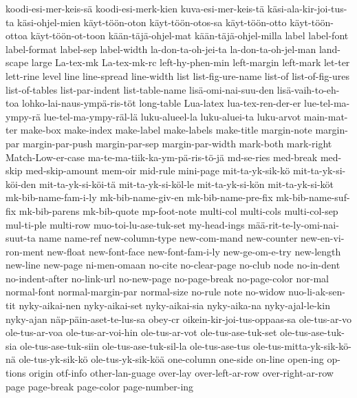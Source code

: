 {  koodi-esi-mer-keis-sä
  koodi-esi-merk-kien
  kuva-esi-mer-keis-tä
  käsi-ala-kir-joi-tus-ta
  käsi-ohjel-mien
  käyt-töön-oton
  käyt-töön-otos-sa
  käyt-töön-otto
  käyt-töön-ottoa
  käyt-töön-ot-toon
  kään-täjä-ohjel-mat
  kään-täjä-ohjel-milla
  label
  label-font
  label-format
  label-sep
  label-width
  la-don-ta-oh-jei-ta
  la-don-ta-oh-jel-man
  land-scape
  large
  La-tex-mk
  La-tex-mk-rc
  left-hy-phen-min
  left-margin
  left-mark
  let-ter
  lett-rine
  level
  line
  line-spread
  line-width
  list
  list-fig-ure-name
  list-of
  list-of-fig-ures
  list-of-tables
  list-par-indent
  list-table-name
  lisä-omi-nai-suu-den
  lisä-vaih-to-eh-toa
  lohko-lai-naus-ympä-ris-töt
  long-table
  Lua-latex
  lua-tex-ren-der-er
  lue-tel-ma-ympy-rä
  lue-tel-ma-ympy-räl-lä
  luku-alueel-la
  luku-aluei-ta
  luku-arvot
  main-mat-ter
  make-box
  make-index
  make-label
  make-labels
  make-title
  margin-note
  margin-par
  margin-par-push
  margin-par-sep
  margin-par-width
  mark-both
  mark-right
  Match-Low-er-case
  ma-te-ma-tiik-ka-ym-pä-ris-tö-jä
  md-se-ries
  med-break
  med-skip
  med-skip-amount
  mem-oir
  mid-rule
  mini-page
  mit-ta-yk-sik-kö
  mit-ta-yk-si-köi-den
  mit-ta-yk-si-köi-tä
  mit-ta-yk-si-köl-le
  mit-ta-yk-si-kön
  mit-ta-yk-si-köt
  mk-bib-name-fam-i-ly
  mk-bib-name-giv-en
  mk-bib-name-pre-fix
  mk-bib-name-suf-fix
  mk-bib-parens
  mk-bib-quote
  mp-foot-note
  multi-col
  multi-cols
  multi-col-sep
  mul-ti-ple
  multi-row
  muo-toi-lu-ase-tuk-set
  my-head-ings
  mää-rit-te-ly-omi-nai-suut-ta
  name
  name-ref
  new-column-type
  new-com-mand
  new-counter
  new-en-vi-ron-ment
  new-float
  new-font-face
  new-font-fam-i-ly
  new-ge-om-e-try
  new-length
  new-line
  new-page
  ni-men-omaan
  no-cite
  no-clear-page
  no-club
  node
  no-in-dent
  no-indent-after
  no-link-url
  no-new-page
  no-page-break
  no-page-color
  nor-mal
  normal-font
  normal-margin-par
  normal-size
  no-rule
  note
  no-widow
  nuo-li-ak-sen-tit
  nyky-aikai-nen
  nyky-aikai-set
  nyky-aikai-sia
  nyky-aika-na
  nyky-ajal-le-kin
  nyky-ajan
  näp-päin-aset-te-lus-sa
  obey-cr
  oikein-kir-joi-tus-oppaas-sa
  ole-tus-ar-vo
  ole-tus-ar-voa
  ole-tus-ar-voi-hin
  ole-tus-ar-vot
  ole-tus-ase-tuk-set
  ole-tus-ase-tuk-sia
  ole-tus-ase-tuk-siin
  ole-tus-ase-tuk-sil-la
  ole-tus-ase-tus
  ole-tus-mitta-yk-sik-kö-nä
  ole-tus-yk-sik-kö
  ole-tus-yk-sik-köä
  one-column
  one-side
  on-line
  open-ing
  op-tions
  origin
  otf-info
  other-lan-guage
  over-lay
  over-left-ar-row
  over-right-ar-row
  page
  page-break
  page-color
  page-number-ing
}
